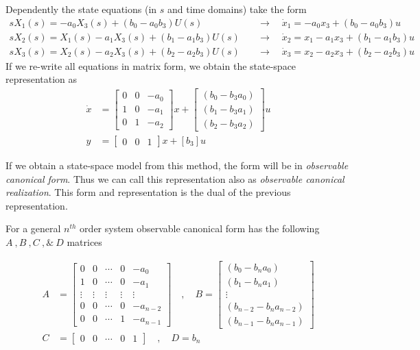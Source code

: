 \documentclass[twoside]{article}
\begin{document}
% 
Dependently the state equations (in $s$ and time domains) take the form
%
%
\begin{align*}
s X_1(s) = -a_0 X_3(s)  + ( b_0 - a_0 b_3) U(s) \quad &\rightarrow \quad \dot{x}_1 = -a_0 x_3  + ( b_0 - a_0 b_3) u
\\
s X_2(s) = X_1(s)  -a_1 X_3(s) + ( b_1 - a_1 b_3 ) U(s)  \quad &\rightarrow \quad \dot{x}_2 = x_1  - a_1 x_3 + ( b_1 - a_1 b_3 ) u
\\
s X_3(s) = X_2(s)  -a_2 X_3(s) + ( b_2 - a_2 b_3 ) U(s)  \quad &\rightarrow \quad \dot{x}_3 = x_2  - a_2 x_3 + ( b_2 - a_2 b_3 ) u
\end{align*}
%
If we re-write all equations in matrix form, we obtain the state-space representation as
%
\begin{align*}
	\dot{x} &= \left[ \begin{array}{ccc} 0 & 0 & -a_0  \\  1 & 0 & -a_1 \\  0 & 1 & -a_2 \end{array} \right] x 
	+ \left[ \begin{array}{c} ( b_0 - b_3 a_0 ) \\ ( b_1 - b_3 a_1 ) \\ ( b_2 - b_3 a_2 ) \end{array} \right] u
	\\
	y &= \left[ \begin{array}{ccc} 0 & 0  & 1 \end{array} \right] x
	+ \left[ b_3 \right] u
\end{align*}

If we obtain a state-space model from this method, the form
will be in \textit{observable canonical form}. Thus we can call this representation also as 
\textit{observable canonical realization}. This form and
representation is the dual of the previous representation. 

For a general $n^{th}$ order system observable
canonical form has the following $A \ ,  B \ ,  C \ , \& \ D$
matrices

\begin{align*}
A &= \left[ \begin{array}{ccccc} 0 & 0 & \cdots & 0 & -a_0 
              \\ 1 & 0 & \cdots & 0 & -a_1 
\\ \vdots & \vdots & \vdots & \vdots & \vdots
\\ 0 & 0 & \cdots & 0 & -a_{n-2}
    \\ 0 & 0 & \cdots & 1 & -a_{n-1} \end{array} \right]
\quad , \quad 
B = \left[ \begin{array}{c} (b_0 - b_n a_0)  \\ (b_1 - b_n
             a_1 ) \\ \vdots \\ (b_{n-2} - b_n a_{n-2} ) \\   (b_{n-1} - b_n
             a_{n-1}) 
\end{array} \right]
\\ C &= \left[ \begin{array}{ccccc} 0 & 0 & \cdots &  0 & 1 \end{array} \right]
\quad , \quad
D = b_n
\end{align*}
\end{document}
